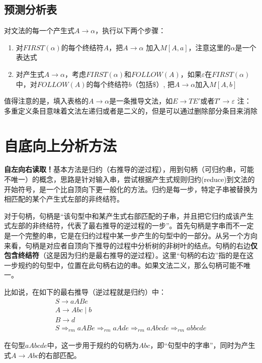 \documentclass[]{report}
\begin{document}
		\subsection{预测分析表}
		对文法的每一个产生式$A\to\alpha$，执行以下两个步骤：
		\begin{enumerate}
			\item 对$FIRST(\alpha)$的每个终结符$A$，把$A\to\alpha$ 加入$M[A, a]$，注意这里的$\alpha$是一个表达式
			\item 对产生式$A\to\alpha$，考虑$FIRST(\alpha)$和$FOLLOW(A)$，如果$\varepsilon$在$FIRST(\alpha)$中，对$FOLLOW(A)$的每个终结符$b$（包括$\$$）, 把$A\to\alpha$加入$M[A, b]$
		\end{enumerate}
		值得注意的是，填入表格的$A\to\alpha$是一条推导文法，如$E\to TE'$或者$T'\to\varepsilon$
		注：多重定义条目意味着文法左递归或者是二义的，但是可以通过删除部分条目来消除
	\section{自底向上分析方法}
		\textbf{自左向右读取！}基本方法是归约（右推导的逆过程），用到句柄（可归约串，可能不唯一）的概念，思路是针对输入串，尝试根据产生式规则归约(reduce)到文法的开始符号，是一个比自顶向下更一般化的方法。归约是每一步，特定子串被替换为相匹配的某个产生式左部的非终结符。\par
		对于句柄，句柄是“该句型中和某产生式右部匹配的子串，并且把它归约成该产生式左部的非终结符，代表了最右推导的逆过程的一步”。首先句柄是字串而不一定是一个完整的串，它是在归约过程中某一步产生的句型中的一部分。从另一个方向来看，句柄是对应者自顶向下推导的过程中分析树的非树叶的结点。句柄的右边\textbf{仅包含终结符}（这是因为归约是最右推导的逆过程）。这里“句柄的右边”指的是在这一步规约的句型中，位置在此句柄右边的串。如果文法二义，那么句柄可能不唯一。\par
		比如说，在如下的最右推导（逆过程就是归约）中：
		\[\begin{gathered}
			S\to aABe\\
			A\to Abc\mid b\\
			B\to d\\
			S\Rightarrow_{rm}aABe\Rightarrow_{rm}aAde\Rightarrow_{rm}aAbcde\Rightarrow_{rm}abbcde
		\end{gathered}\]\par
		在句型$aAbcde$中，这一步用于规约的句柄为$Abc$，即“句型中的字串”，同时为产生式$A\to Abc$的右部匹配。
\end{document}
